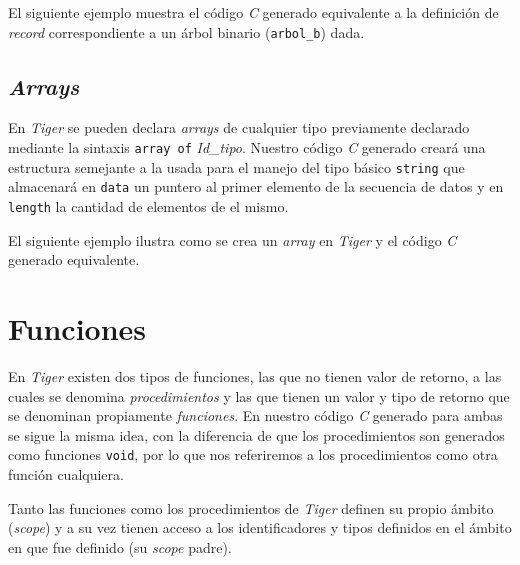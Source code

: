 \documentclass{article}
\begin{document}
El siguiente ejemplo muestra el código \textit{C} generado equivalente a la
definición de \textit{record} correspondiente a un árbol binario
(\texttt{arbol\_b}) dada.

\begin{quote}

\end{quote}

\begin{quote}

\end{quote}

\subsection{\emph{Arrays}}

En \textit{Tiger} se pueden declara \textit{arrays} de cualquier tipo
previamente declarado mediante la sintaxis \texttt{array of} \textit{Id\_tipo}.
Nuestro código \textit{C} generado creará una estructura semejante a la usada
para el manejo del tipo básico \texttt{string} que almacenará en \texttt{data}
un puntero al primer elemento de la secuencia de datos y en \texttt{length} la
cantidad de elementos de el mismo.

El siguiente ejemplo ilustra como se crea un \textit{array} en \textit{Tiger} y
el código \textit{C} generado equivalente.

\begin{quote}

\end{quote}

\begin{quote}

\end{quote}

\section{Funciones}

En \textit{Tiger} existen dos tipos de funciones, las que no tienen valor de
retorno, a las cuales se denomina \textit{procedimientos} y las que tienen un
valor y tipo de retorno que se denominan propiamente \textit{funciones}. En
nuestro código \textit{C} generado para ambas se sigue la misma idea, con la
diferencia de que los procedimientos son generados como funciones
\texttt{void}, por lo que nos referiremos a los procedimientos como otra
función cualquiera.

Tanto las funciones como los procedimientos de \textit{Tiger} definen su propio
ámbito (\textit{scope}) y a su vez tienen acceso a los identificadores y tipos
definidos en el ámbito en que fue definido (su \textit{scope} padre).
\end{document}
